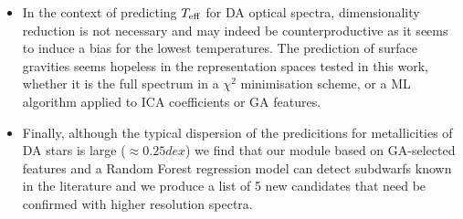 \begin{itemize}
\item In the context of predicting $T_{\rm eff}$ for DA optical spectra, 
      dimensionality reduction is not necessary and may indeed be counterproductive 
      as it seems to induce a bias for the lowest temperatures. 
      The prediction of surface gravities seems hopeless in the representation 
      spaces tested in this work, whether it is the full spectrum 
      in a $\chi^2$ minimisation scheme, or a ML algorithm 
      applied to ICA coefficients or GA features.

\item Finally, although the typical dispersion of the predicitions for 
      metallicities of DA stars is large ($\approx 0.25 dex$) we find 
      that our module based on GA-selected features and a Random Forest 
      regression model can detect subdwarfs known in the literature and we 
      produce a list of 5 new candidates that need be confirmed with 
      higher resolution spectra.  

\end{itemize}
